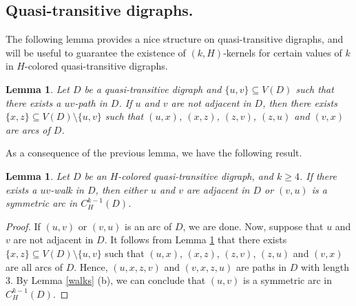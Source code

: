 \documentclass[10pt,a4paper]{article}
\newtheorem{lemma}[theorem]{Lemma}
\begin{document}
\subsection{Quasi-transitive digraphs.}

The following lemma provides a nice structure on quasi-transitive digraphs, and will be useful to guarantee the existence of $(k,H)$-kernels for certain values of $k$ in $H$-colored quasi-transitive digraphs.

\begin{lemma}\cite{1}
\label{quasibang}
Let $D$ be a quasi-transitive digraph and $\{u, v \} \subseteq V(D)$ such that there exists a $uv$-path in $D$. If $u$ and $v$ are not adjacent in $D$, then there exists $\{ x,z \} \subseteq V(D) \setminus \{u,v \}$ such that $(u,x)$, $(x,z)$, $(z,v)$, $(z,u)$ and $(v,x)$ are arcs of $D$.
\end{lemma}

As a consequence of the previous lemma, we have the following result.

\begin{lemma}
\label{quasi}
Let $D$ be an $H$-colored quasi-transitive digraph, and $k \geq 4$. If there exists a $uv$-walk in $D$, then either $u$ and $v$ are adjacent in $D$ or $(v,u)$ is a symmetric arc in $C_{H}^{k-1}(D)$.
\end{lemma}
\begin{proof}
If $(u,v)$ or $(v,u)$ is an arc of $D$, we are done. Now, suppose that $u$ and $v$ are not adjacent in $D$. It follows from Lemma \ref{quasibang} that there exists $\{ x,z \} \subseteq V(D) \setminus \{u,v \}$ such that $(u,x)$, $(x,z)$, $(z,v)$, $(z,u)$ and $(v,x)$ are all arcs of $D$. Hence, $(u,x,z,v)$ and $(v,x,z,u)$ are paths in $D$ with length 3. By Lemma \ref{walks} (b), we can conclude that $(u,v)$ is a symmetric arc in $C_{H}^{k-1}(D)$.  
\end{proof}
\end{document}
